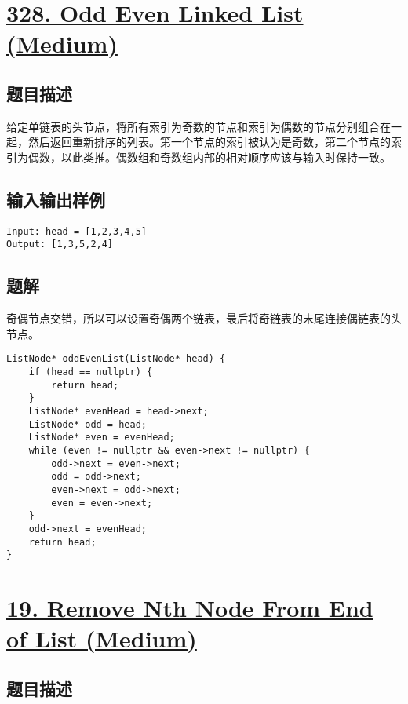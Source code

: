\documentclass[lang=cn,10pt]{elegantbook}
\begin{document}
{\color{red}\section{\href{https://leetcode.cn/problems/odd-even-linked-list/}{328. Odd Even Linked List (Medium)}}} \label{ch13.328}

\subsection*{题目描述}

给定单链表的头节点，将所有索引为奇数的节点和索引为偶数的节点分别组合在一起，然后返回重新排序的列表。第一个节点的索引被认为是奇数，第二个节点的索引为偶数，以此类推。偶数组和奇数组内部的相对顺序应该与输入时保持一致。

\subsection*{输入输出样例}

\begin{lstlisting}
Input: head = [1,2,3,4,5]
Output: [1,3,5,2,4]
\end{lstlisting}

\subsection*{题解}

奇偶节点交错，所以可以设置奇偶两个链表，最后将奇链表的末尾连接偶链表的头节点。

\begin{lstlisting}
ListNode* oddEvenList(ListNode* head) {
	if (head == nullptr) {
		return head;
	}
	ListNode* evenHead = head->next;
	ListNode* odd = head;
	ListNode* even = evenHead;
	while (even != nullptr && even->next != nullptr) {
		odd->next = even->next;
		odd = odd->next;
		even->next = odd->next;
		even = even->next;
	}
	odd->next = evenHead;
	return head;
}
\end{lstlisting}

{\color{red}\section{\href{https://leetcode.cn/problems/remove-nth-node-from-end-of-list/}{19. Remove Nth Node From End of List (Medium)}}} \label{ch13.19}

\subsection*{题目描述}
\end{document}
